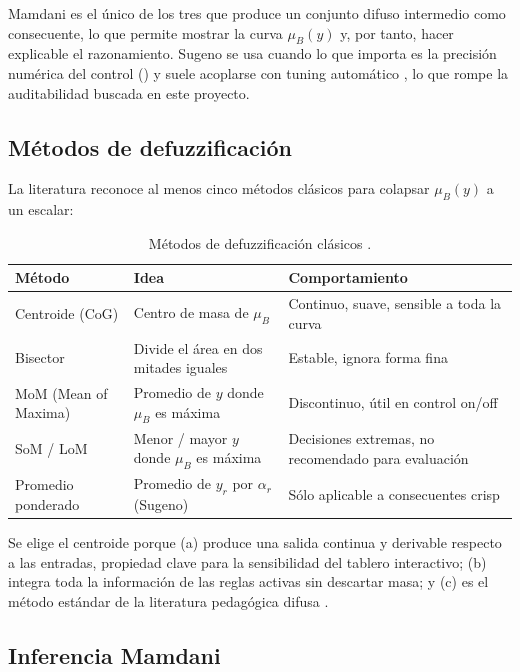 Mamdani es el único de los tres que produce un conjunto difuso intermedio como consecuente, lo que permite mostrar la curva $\mu_B(y)$ y, por tanto, hacer explicable el razonamiento. Sugeno se usa cuando lo que importa es la precisión numérica del control (\citet{takagi1985fuzzy}) y suele acoplarse con tuning automático \citep{jang1993anfis}, lo que rompe la auditabilidad buscada en este proyecto.

\subsection{Métodos de defuzzificación}
\label{sec:defuzz-methods}

La literatura reconoce al menos cinco métodos clásicos para colapsar $\mu_B(y)$ a un escalar:

\begin{table}[H]
  \centering
  \small
  \begin{tabularx}{0.96\linewidth}{l X X}
    \toprule
    \textbf{Método} & \textbf{Idea} & \textbf{Comportamiento}\\
    \midrule
    Centroide (CoG) & Centro de masa de $\mu_B$ & Continuo, suave, sensible a toda la curva\\
    Bisector & Divide el área en dos mitades iguales & Estable, ignora forma fina\\
    MoM (Mean of Maxima) & Promedio de $y$ donde $\mu_B$ es máxima & Discontinuo, útil en control on/off\\
    SoM / LoM & Menor / mayor $y$ donde $\mu_B$ es máxima & Decisiones extremas, no recomendado para evaluación\\
    Promedio ponderado & Promedio de $y_r$ por $\alpha_r$ (Sugeno) & Sólo aplicable a consecuentes crisp\\
    \bottomrule
  \end{tabularx}
  \caption{Métodos de defuzzificación clásicos \citep{ross2010fuzzy,lee1990fuzzy}.}
  \label{tab:defuzz}
\end{table}

Se elige el centroide porque (a) produce una salida continua y derivable respecto a las entradas, propiedad clave para la sensibilidad del tablero interactivo; (b) integra toda la información de las reglas activas sin descartar masa; y (c) es el método estándar de la literatura pedagógica difusa \citep{ross2010fuzzy,lee1990fuzzy}.

\subsection{Inferencia Mamdani}

